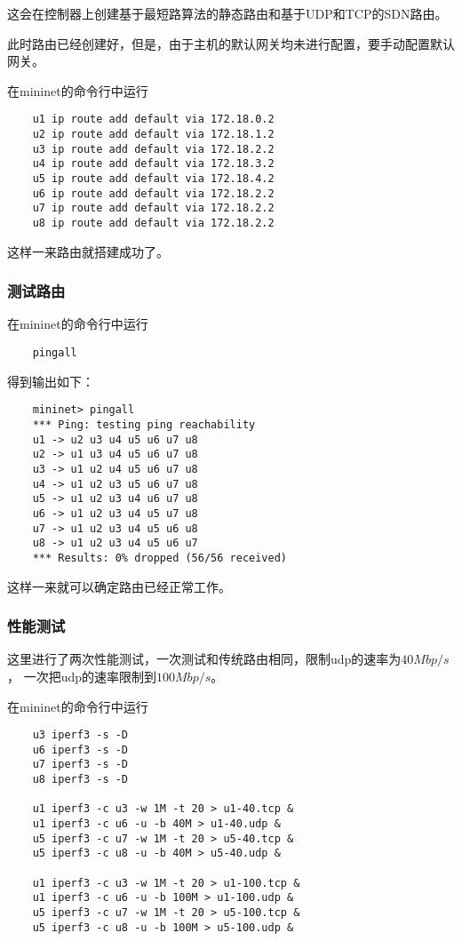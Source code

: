 这会在控制器上创建基于最短路算法的静态路由和基于UDP和TCP的SDN路由。

此时路由已经创建好，但是，由于主机的默认网关均未进行配置，要手动配置默认网关。

在mininet的命令行中运行

\begin{lstlisting}
	u1 ip route add default via 172.18.0.2 
	u2 ip route add default via 172.18.1.2
	u3 ip route add default via 172.18.2.2
	u4 ip route add default via 172.18.3.2
	u5 ip route add default via 172.18.4.2
	u6 ip route add default via 172.18.2.2
	u7 ip route add default via 172.18.2.2
	u8 ip route add default via 172.18.2.2
\end{lstlisting}

这样一来路由就搭建成功了。

\subsubsection{测试路由}

在mininet的命令行中运行

\begin{lstlisting}
	pingall
\end{lstlisting}

得到输出如下：

\begin{lstlisting}
	mininet> pingall
	*** Ping: testing ping reachability
	u1 -> u2 u3 u4 u5 u6 u7 u8 
	u2 -> u1 u3 u4 u5 u6 u7 u8 
	u3 -> u1 u2 u4 u5 u6 u7 u8 
	u4 -> u1 u2 u3 u5 u6 u7 u8 
	u5 -> u1 u2 u3 u4 u6 u7 u8 
	u6 -> u1 u2 u3 u4 u5 u7 u8 
	u7 -> u1 u2 u3 u4 u5 u6 u8 
	u8 -> u1 u2 u3 u4 u5 u6 u7 
	*** Results: 0% dropped (56/56 received)
\end{lstlisting}

这样一来就可以确定路由已经正常工作。

\subsubsection{性能测试}

这里进行了两次性能测试，一次测试和传统路由相同，限制udp的速率为$40 Mbp/s$，
一次把udp的速率限制到$100 Mbp/s$。

在mininet的命令行中运行

\begin{lstlisting}
	u3 iperf3 -s -D
	u6 iperf3 -s -D
	u7 iperf3 -s -D
	u8 iperf3 -s -D

	u1 iperf3 -c u3 -w 1M -t 20 > u1-40.tcp &
	u1 iperf3 -c u6 -u -b 40M > u1-40.udp &
	u5 iperf3 -c u7 -w 1M -t 20 > u5-40.tcp &
	u5 iperf3 -c u8 -u -b 40M > u5-40.udp &

	u1 iperf3 -c u3 -w 1M -t 20 > u1-100.tcp &
	u1 iperf3 -c u6 -u -b 100M > u1-100.udp &
	u5 iperf3 -c u7 -w 1M -t 20 > u5-100.tcp &
	u5 iperf3 -c u8 -u -b 100M > u5-100.udp &
\end{lstlisting}

